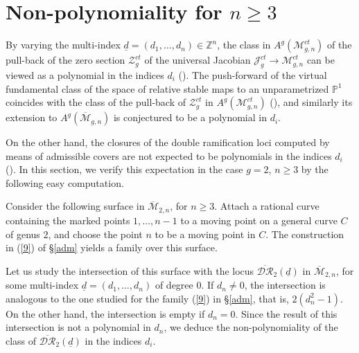 \documentclass[10pt]{amsart}
\theoremstyle{definition}
\begin{document}
\appendix

\section{\texorpdfstring{Non-polynomiality for $n\geq 3$}{Non-polynomiality}}

By varying the multi-index $\underline{d}=(d_1,\dots,d_n)\in\mathbb{Z}^n$, 
the class in $A^g({\mathcal{M}}_{g,n}^{ct})$ of the pull-back of the zero section ${\mathcal{Z}}_g^{ct}$ of the universal Jacobian $\mathcal{J}^{ct}_g\rightarrow {\mathcal{M}}_{g,n}^{ct}$ can be viewed as a polynomial in the indices $d_i$ (\cite{Hain}). The push-forward of the virtual fundamental class of the space of relative stable maps to an unparametrized $\mathbb{P}^1$ coincides with the class of the pull-back of ${\mathcal{Z}}_g^{ct}$ in $A^g({\mathcal{M}}_{g,n}^{ct})$ (\cite{MR2864866}), and similarly its extension to $A^g({\overline{\mathcal{M}}}_{g,n})$ is conjectured to be a polynomial in $d_i$.

On the other hand, the closures of the double ramification loci computed by means of admissible covers are not expected to be polynomials in the indices $d_i$ (\cite{BSSZ}). In this section, we verify this expectation in the case $g=2$, $n\geq 3$ by the following easy computation.

Consider the following surface in ${\overline{\mathcal{M}}}_{2,n}$, for $n\geq 3$. Attach a rational curve containing the marked points $1,\dots,n-1$ to a moving point on a general curve $C$ of genus $2$, and choose the point $n$ to be a moving point in $C$. 
The construction in (\ref{9}) of \S \ref{adm} yields a family over this surface.

Let us study the intersection of this surface with the locus $\overline{\mathcal{DR}}_2(\underline{d})$ in ${\overline{\mathcal{M}}}_{2,n}$, for some multi-index $\underline{d}=(d_1,\dots,d_n)$ of degree $0$. If $d_n\not= 0$, the intersection is analogous to the one studied for the family (\ref{9}) in \S \ref{adm}, that is, $2(d_n^2-1)$. On the other hand, the intersection is empty if $d_n=0$. Since the result of this intersection is not a polynomial in $d_n$, we deduce the non-polynomiality of the class of $\overline{\mathcal{DR}}_2(\underline{d})$ in the indices $d_i$.



\end{document}
